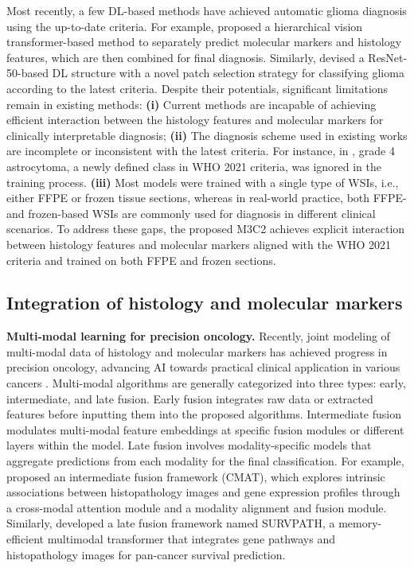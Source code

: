 Most recently, a few DL-based methods \citep{hollon2023artificial,charm,lv2024insight} have achieved automatic glioma diagnosis using the up-to-date criteria. For example, \cite{hollon2023artificial} proposed a hierarchical vision transformer-based method to separately predict molecular markers and histology features, which are then combined for final diagnosis. Similarly, \cite{lv2024insight} devised a ResNet-50-based DL structure with a novel patch selection strategy for classifying glioma according to the latest criteria. Despite their potentials, significant limitations remain in existing methods: \textbf{(i)} Current methods are incapable of achieving efficient interaction between the histology features and molecular markers for clinically interpretable diagnosis; \textbf{(ii)} The diagnosis scheme used in existing works are incomplete or inconsistent with the latest criteria. For instance, in \citep {hollon2023artificial}, grade 4 astrocytoma, a newly defined class in WHO 2021 criteria, was ignored in the training process. 
\textbf{(iii)} Most models were trained with a single type of WSIs, i.e., either FFPE or frozen tissue sections, whereas in real-world practice, both FFPE- and   frozen-based WSIs are commonly used for diagnosis in different clinical scenarios. To address these gaps, the proposed M3C2 achieves explicit interaction between histology features and molecular markers aligned with the WHO 2021 criteria and trained on both FFPE and frozen sections.



\vspace{-.5em}
\subsection{Integration of histology and molecular markers}


\noindent\textbf{Multi-modal learning for precision oncology.}
Recently, joint modeling of multi-modal data of histology and molecular markers has achieved progress in precision oncology, advancing AI towards practical clinical application in various cancers \citep{zhang2024prototypical, wei2023multi}.
Multi-modal algorithms are generally categorized into three types: early, intermediate, and late fusion. Early fusion integrates raw data or extracted features before inputting them into the proposed algorithms. Intermediate fusion \citep{CMAT, jaume2024modeling} modulates multi-modal feature embeddings at specific fusion modules or different layers within the model. Late fusion \citep{shao2019integrative} involves modality-specific models that aggregate predictions from each modality for the final classification. For example, \cite{CMAT} proposed an intermediate fusion framework (CMAT), which explores intrinsic associations between histopathology images and gene expression profiles through a cross-modal attention module and a modality alignment and fusion module. Similarly,  \cite{jaume2024modeling} developed a late fusion framework named SURVPATH, a memory-efficient multimodal transformer that integrates gene pathways and histopathology images for pan-cancer survival prediction.




